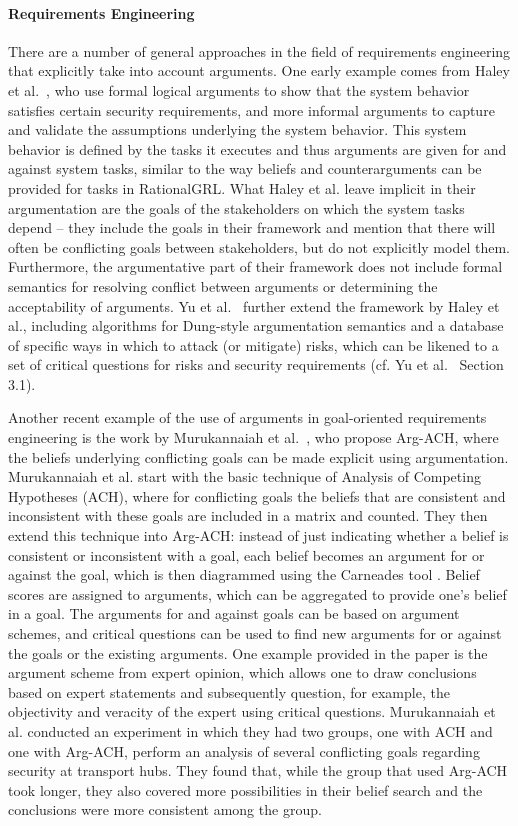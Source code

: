 \paragraph{Requirements Engineering} There are a number of general approaches in the field of requirements engineering that explicitly take into account arguments. One early example comes from Haley et al.~\cite{haley2008security}, who use formal logical arguments to show that the system behavior satisfies certain security requirements, and more informal arguments to capture and validate the assumptions underlying the system behavior. This system behavior is defined by the tasks it executes and thus arguments are given for and against system tasks, similar to the way beliefs and counterarguments can be provided for tasks in RationalGRL. What Haley et al. leave implicit in their argumentation are the goals of the stakeholders on which the system tasks depend -- they include the goals in their framework and mention that there will often be conflicting goals between stakeholders, but do not explicitly model them. Furthermore, the argumentative part of their framework does not include formal semantics for resolving conflict between arguments or determining the acceptability of arguments. Yu et al.~\cite{yu2015automated} further extend the framework by Haley et al., including algorithms for Dung-style argumentation semantics \cite{Dung1995} and a database of specific ways in which to attack (or mitigate) risks, which can be likened to a set of critical questions for risks and security requirements (cf. Yu et al.~\cite{yu2015automated} Section 3.1). 

Another recent example of the use of arguments in goal-oriented requirements engineering is the work by Murukannaiah et al.~\cite{murukannaiah2015}, who propose Arg-ACH, where the beliefs underlying conflicting goals can be made explicit using argumentation. Murukannaiah et al. start with the basic technique of Analysis of Competing Hypotheses (ACH), where for conflicting goals the beliefs that are consistent and inconsistent with these goals are included in a matrix and counted. They then extend this technique into Arg-ACH: instead of just indicating whether a belief is consistent or inconsistent with a goal, each belief becomes an argument for or against the goal, which is then diagrammed using the Carneades tool \cite{gordon2007visualizing}. Belief scores are assigned to arguments, which can be aggregated to provide one's belief in a goal. The arguments for and against goals can be based on argument schemes, and critical questions can be used to find new arguments for or against the goals or the existing arguments. One example provided in the paper is the argument scheme from expert opinion, which allows one to draw conclusions based on expert statements and subsequently question, for example, the objectivity and veracity of the expert using critical questions. Murukannaiah et al. conducted an experiment in which they had two groups, one with ACH and one with Arg-ACH, perform an analysis of several conflicting goals regarding security at transport hubs. They found that, while the group that used Arg-ACH took longer, they also covered more possibilities in their belief search and the conclusions were more consistent among the group. 

